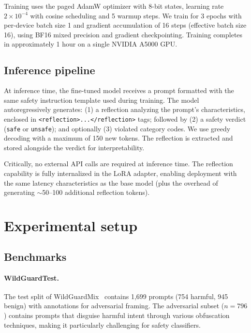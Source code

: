 \documentclass[11pt]{article}
\begin{document}
Training uses the paged AdamW optimizer with 8-bit states, learning rate $2 \times 10^{-4}$ with cosine scheduling and 5 warmup steps. We train for 3 epochs with per-device batch size 1 and gradient accumulation of 16 steps (effective batch size 16), using BF16 mixed precision and gradient checkpointing. Training completes in approximately 1 hour on a single NVIDIA A5000 GPU.

\subsection{Inference pipeline}

At inference time, the fine-tuned model receives a prompt formatted with the same safety instruction template used during training. The model autoregressively generates: (1) a reflection analyzing the prompt's characteristics, enclosed in \texttt{<reflection>...</reflection>} tags; followed by (2) a safety verdict (\texttt{safe} or \texttt{unsafe}); and optionally (3) violated category codes. We use greedy decoding with a maximum of 150 new tokens. The reflection is extracted and stored alongside the verdict for interpretability.

Critically, no external API calls are required at inference time. The reflection capability is fully internalized in the LoRA adapter, enabling deployment with the same latency characteristics as the base model (plus the overhead of generating $\sim$50--100 additional reflection tokens).

\section{Experimental setup}

\subsection{Benchmarks}

\paragraph{WildGuardTest.} The test split of WildGuardMix~\citep{han2024wildguard} contains 1{,}699 prompts (754 harmful, 945 benign) with annotations for adversarial framing. The adversarial subset ($n = 796$) contains prompts that disguise harmful intent through various obfuscation techniques, making it particularly challenging for safety classifiers.
\end{document}
